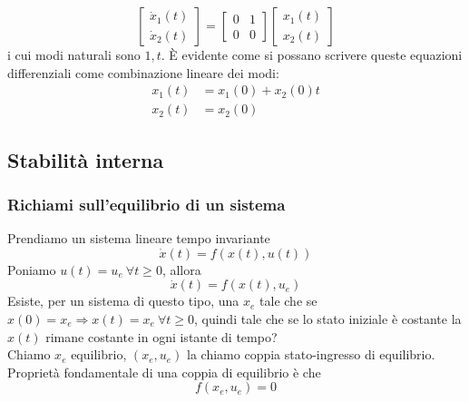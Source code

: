 \documentclass{article}
\numberwithin{equation}{subsection}
\let\oldsubsection\subsection%
\renewcommand{\subsection}{%
  \renewcommand{\theequation}{\thesubsection.\arabic{equation}}%
  \oldsubsection}%
\begin{document}
\begin{itemize}
\begin{equation}
\begin{bmatrix}
            \dot x_1(t)\\
            \dot x_2(t)
        \end{bmatrix} =
        \begin{bmatrix}
            0 & 1\\
            0 & 0
        \end{bmatrix}
        \begin{bmatrix}
            x_1(t)\\
            x_2(t)
        \end{bmatrix}
    \end{equation}
    i cui modi naturali sono $1,t$. È evidente come si possano scrivere queste equazioni differenziali come combinazione lineare dei modi:
    \begin{align*}
        x_1(t) &= x_1(0) + x_2(0)t\\
        x_2(t) &= x_2(0) 
    \end{align*}
\end{itemize}

\subsection{Stabilità interna}
\subsubsection{Richiami sull'equilibrio di un sistema}
Prendiamo un sistema lineare tempo invariante 
\begin{equation}
    \dot x(t) = f(x(t), u(t))
\end{equation}
Poniamo $u(t) = u_e \ \forall t \geq 0$, allora
\begin{equation}
    \dot x(t) = f(x(t), u_e) \tag*{$x(0)=x_0$}
\end{equation}
Esiste, per un sistema di questo tipo, una $x_e$ tale che se $x(0)=x_e \Longrightarrow x(t) = x_e \ \forall t \geq 0$, quindi tale che se lo stato iniziale è costante la $x(t)$ rimane costante in ogni istante di tempo?
\vspace*{0,2cm}\\
Chiamo $x_e$ equilibrio, $(x_e,u_e)$ la chiamo coppia stato-ingresso di equilibrio.
\vspace*{0.2cm}\\
Proprietà fondamentale di una coppia di equilibrio è che
\begin{equation}
    f(x_e,u_e) = 0
\end{equation}
\end{document}
